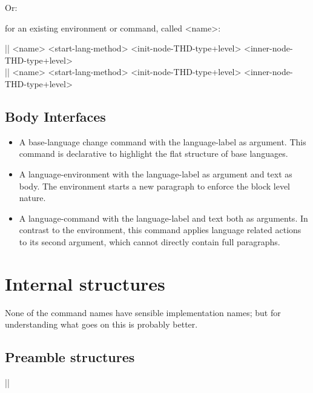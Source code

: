 \documentclass{ltxguide}
\begin{document}
Or:

for an existing environment or command, called <name>:

\begin{decl}
|\DeclareSREnvironment| <name> <start-lang-method>
    <init-node-THD-type+level> <inner-node-THD-type+level> \\
|\DeclareSRCommand| <name> <start-lang-method> <init-node-THD-type+level>
    <inner-node-THD-type+level>
\end{decl}



\subsection{Body Interfaces}

\begin{itemize}
\item 
  A base-language change command with the language-label as
  argument.  This command is declarative to highlight the flat
  structure of base languages.

\item 
  A language-environment with the language-label as argument and text
  as body.  The environment starts a new paragraph to enforce the block
  level nature.

\item 
  A language-command with the language-label and text both as
  arguments. In contrast to the environment, this command applies
  language related actions to its second argument, which cannot
  directly contain full paragraphs.
\end{itemize}





\section{Internal structures}

None of the command names have sensible implementation names; but for
understanding what goes on this is probably better.

\subsection{Preamble structures}


\begin{decl}
|\usedlanguagecmds|
\end{decl}
\end{document}
